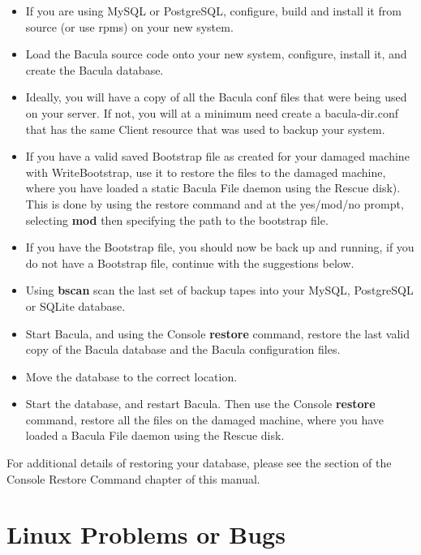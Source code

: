 \begin{itemize}
\item If you are using MySQL or PostgreSQL, configure, build and install it
   from source (or use rpms) on your new system.  
\item Load the Bacula source code onto your new system, configure,  install
   it, and create the Bacula database.  
\item Ideally, you will have a copy of all the Bacula conf files that
   were being used on your server. If not, you will at a minimum need
   create a bacula-dir.conf that has the same Client resource that
   was used to backup your system.
\item If you have a valid saved Bootstrap file as created for your  damaged
   machine with WriteBootstrap, use it to restore the files to the damaged
   machine, where you have loaded a static Bacula File daemon using the
   Rescue disk).  This is done by using the restore command and at
   the yes/mod/no prompt, selecting {\bf mod} then specifying the path to
   the bootstrap file.
\item If you have the Bootstrap file, you should now be back up and  running,
   if you do not have a Bootstrap file, continue with the  suggestions below.  
\item Using {\bf bscan} scan the last set of backup tapes into your  MySQL,
   PostgreSQL or SQLite database.  
\item Start Bacula, and using the Console {\bf restore} command,  restore the
   last valid copy of the Bacula database and the Bacula configuration
   files.  
\item Move the database to the correct location. 
\item Start the database, and restart Bacula. Then use the Console {\bf
   restore} command, restore all the files  on the damaged machine, where you
   have loaded a Bacula File  daemon using the Rescue disk. 
\end{itemize}

For additional details of restoring your database, please see the
 section
of the Console Restore Command chapter of this manual.


\label{problems2}
\section{Linux Problems or Bugs}

